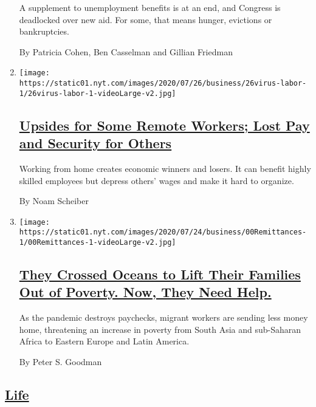 \begin{enumerate}
  A supplement to unemployment benefits is at an end, and Congress is
  deadlocked over new aid. For some, that means hunger, evictions or
  bankruptcies.

  By Patricia Cohen, Ben Casselman and Gillian Friedman
\item
  \texttt{[image: https://static01.nyt.com/images/2020/07/26/business/26virus-labor-1/26virus-labor-1-videoLarge-v2.jpg]}

  \hypertarget{upsides-for-some-remote-workers-lost-pay-and-security-for-others}{%
  \subsection{\texorpdfstring{\href{/2020/07/26/business/economy/labor-remote-work-coronavirus.html}{Upsides
  for Some Remote Workers; Lost Pay and Security for
  Others}}{Upsides for Some Remote Workers; Lost Pay and Security for Others}}\label{upsides-for-some-remote-workers-lost-pay-and-security-for-others}}

  Working from home creates economic winners and losers. It can benefit
  highly skilled employees but depress others' wages and make it hard to
  organize.

  By Noam Scheiber
\item
  \texttt{[image: https://static01.nyt.com/images/2020/07/24/business/00Remittances-1/00Remittances-1-videoLarge-v2.jpg]}

  \hypertarget{they-crossed-oceans-to-lift-their-families-out-of-poverty-now-they-need-help}{%
  \subsection{\texorpdfstring{\href{/2020/07/27/business/global-remittances-coronavirus.html}{They
  Crossed Oceans to Lift Their Families Out of Poverty. Now, They Need
  Help.}}{They Crossed Oceans to Lift Their Families Out of Poverty. Now, They Need Help.}}\label{they-crossed-oceans-to-lift-their-families-out-of-poverty-now-they-need-help}}

  As the pandemic destroys paychecks, migrant workers are sending less
  money home, threatening an increase in poverty from South Asia and
  sub-Saharan Africa to Eastern Europe and Latin America.

  By Peter S. Goodman
\end{enumerate}

\hypertarget{life}{%
\subsection{\texorpdfstring{\protect\hyperlink{}{Life}}{Life}}\label{life}}

